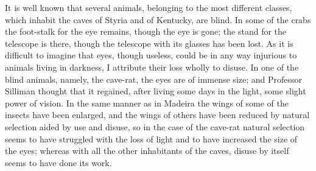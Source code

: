It is well known that several animals, belonging to the most different classes, which inhabit the caves of Styria and of Kentucky, are blind. In some of the crabs the foot-stalk for the eye remains, though the eye is gone; the stand for the telescope is there, though the telescope with its glasses has been lost. As it is difficult to imagine that eyes, though useless, could be in any way injurious to animals living in darkness, I attribute their loss wholly to disuse. In one of the blind animals, namely, the cave-rat, the eyes are of immense size; and Professor Silliman thought that it regained, after living some days in the light, some slight power of vision. In the same manner as in Madeira the wings of some of the insects have been enlarged, and the wings of others have been reduced by natural selection aided by use and disuse, so in the case of the cave-rat natural selection seems to have struggled with the loss of light and to have increased the size of the eyes; whereas with all the other inhabitants of the caves, disuse by itself seems to have done its work.
